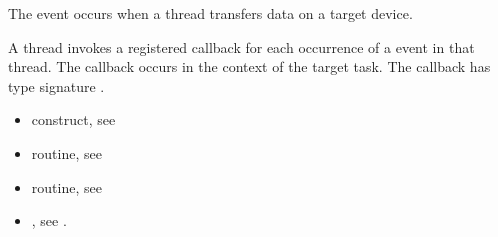 \begin{ccppspecific}

\events
The  event occurs when a thread transfers data on a target device.

\tools

A thread invokes a registered 
callback for each occurrence of a  event in that thread.
The callback occurs in the context of the target task.  The callback has type signature
.


\crossreferences
\begin{itemize}
\item {} construct, see 

\item {} routine, see

\item {} routine, see 


\item {}, see
.

\end{itemize}

\subsection{}
\label{subsec:omp_target_associate_ptr}
\summary


\end{ccppspecific}
